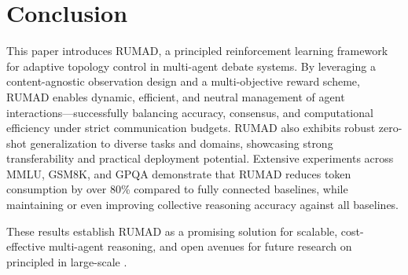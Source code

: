 \section{Conclusion}



This paper introduces RUMAD, a principled reinforcement learning framework for adaptive topology control in multi-agent debate systems. By leveraging a content-agnostic observation design and a multi-objective reward scheme, RUMAD enables dynamic, efficient, and neutral management of agent interactions—successfully balancing accuracy, consensus, and computational efficiency under strict communication budgets. RUMAD also exhibits robust zero-shot generalization to diverse tasks and domains, showcasing strong transferability and practical deployment potential. Extensive experiments across MMLU, GSM8K, and GPQA demonstrate that RUMAD reduces token consumption by over 80\% compared to fully connected baselines, while maintaining or even improving collective reasoning accuracy against all baselines. 

These results establish RUMAD as a promising solution for scalable, cost-effective multi-agent reasoning, and open avenues for future research on principled  in large-scale . 
